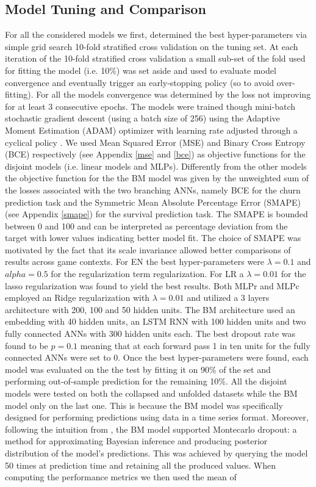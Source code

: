 \subsection{Model Tuning and Comparison}
\label{tuning_comparison_1}
For all the considered models we first, determined the best hyper-parameters via simple grid search 10-fold stratified cross validation \cite{scikit-learn} on the tuning set. At each iteration of the 10-fold stratified cross validation a small sub-set of the fold used for fitting the model (i.e. 10\%) was set aside and used to evaluate model convergence and eventually trigger an early-stopping policy (so to avoid over-fitting). For all the models convergence was determined by the loss not improving for at least 3 consecutive epochs. The models were trained though mini-batch stochastic gradient descent (using a batch size of 256) using the Adaptive Moment Estimation (ADAM) optimizer \cite{kingma2014adam} with learning rate adjusted through a cyclical policy \cite{smith2017cyclical, chollet2015keras}. We used Mean Squared Error (MSE) and Binary Cross Entropy (BCE) respectively (see Appendix \ref{mse} and \ref{bce}) as objective functions for the disjoint models (i.e. linear models and MLPs). Differently from the other models the objective function for the the BM model was given by the unweighted sum of the losses associated with the two branching ANNs, namely BCE for the churn prediction task and the Symmetric Mean Absolute Percentage Error (SMAPE) (see Appendix \ref{smape}) for the survival prediction task. The SMAPE is bounded between 0 and 100 and can be interpreted as percentage deviation from the target with lower values indicating better model fit. The choice of SMAPE was motivated by the fact that its scale invariance allowed better comparisons of results across game contexts. For EN the best hyper-parameters were $\lambda = 0.1$ and $alpha=0.5$ for the regularization term regularization. For LR a $\lambda = 0.01$ for the lasso regularization was found to yield the best results. Both MLPr and MLPc employed an Ridge regularization with $\lambda=0.01$ and utilized a 3 layers architecture with 200, 100 and 50 hidden units. The BM architecture used an embedding with 40 hidden units, an LSTM RNN with 100 hidden units and two fully connected ANNs with 300 hidden units each. The best dropout rate was found to be $p=0.1$ meaning that at each forward pass 1 in ten units for the fully connected ANNs were set to 0. Once the best hyper-parameters were found, each model was evaluated on the the test by fitting it on 90\% of the set and performing out-of-sample prediction for the remaining 10\%. All the disjoint models were tested on both the collapsed and unfolded datasets while the BM model only on the last one. This is because the BM model was specifically designed for performing predictions using data in a time series format. Moreover, following the intuition from \cite{gal2016dropout}, the BM model supported Montecarlo dropout: a method for approximating Bayesian inference and producing posterior distribution of the model's predictions. This was achieved by querying the model 50 times at prediction time and retaining all the produced values. When computing the performance metrics we then used the mean of 